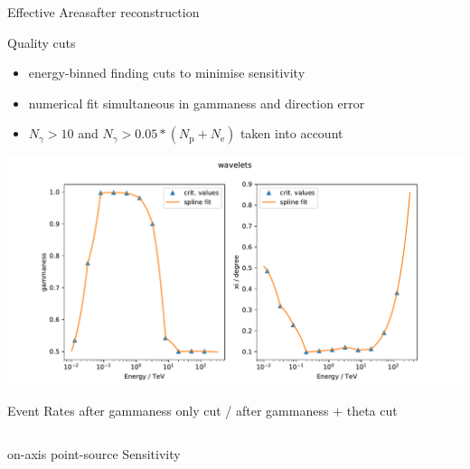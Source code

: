 \documentclass[8pt]{beamer}
\begin{document}
    \begin{frame}{Effective Areas}{after reconstruction}
        \centering
        \setlength{\figureheight}{7cm}
        \setlength{\figurewidth}{.75\textwidth}
        

    \end{frame}


    \begin{frame}{Quality cuts}
        \begin{itemize}
            \item energy-binned finding cuts to minimise sensitivity
            \item numerical fit simultaneous in gammaness and direction error
            \item $N_\gamma > 10$ and $N_\gamma > 0.05 * (N_\mathrm{p} + N_\mathrm{e})$
                taken into account
        \end{itemize}

        \centering
        \includegraphics[width=.9\textwidth]{pics/cuts_vs_E_wave}

    \end{frame}


    \begin{frame}{Event Rates}
        {after gammaness only cut / after gammaness + theta cut}
        \begin{columns}
            \setlength{\figureheight}{7.cm}
            \setlength{\figurewidth}{.5\textwidth}
                
                
        \end{columns}

    \end{frame}


    \begin{frame}{on-axis point-source Sensitivity}
        \setlength{\figureheight}{6.5cm}
        \setlength{\figurewidth}{.85\textwidth}
        \centering
        
        \setlength{\figureheight}{3.5cm}
        

    \end{frame}
\end{document}
